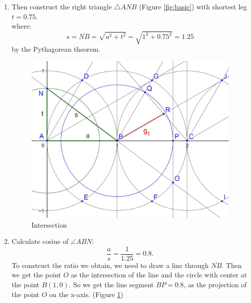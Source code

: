 \documentclass[12pt, letterpaper, oneside]{report}
\begin{document}
\begin{enumerate}
	\item Then construct the right triangle $\triangle ANB$ (Figure \ref{fig:basic}) with shortest leg $t=0.75$. \\
	where:
\begin{equation}
s=\overline{NB}=\sqrt{a^{2}+t^{2}}=\sqrt{1^{2}+0.75^{2}}=1.25
\end{equation}
by the Pythagorean theorem. 
\begin{figure}[h]
	\centerline{\includegraphics[scale=0.2]{intersection.jpg}}
	\caption{Intersection}
	\label{intersection}
\end{figure}
 
	\item Calculate cosine of $\angle ABN$:
\begin{equation}
	\dfrac{a}{s}=\dfrac{1}{1.25}=0.8.
\end{equation}
\newpage
To construct the ratio we obtain, we need to draw a line through $\overline{NB}$. Then we get the point $O$ as the intersection of the line and the circle with center at the point $B(1,0)$. So we get the line segment $BP=0.8$, as the projection of the point $O$ on the x-axis. (Figure \ref{intersection})\\ 
	

\end{enumerate}
\end{document}
